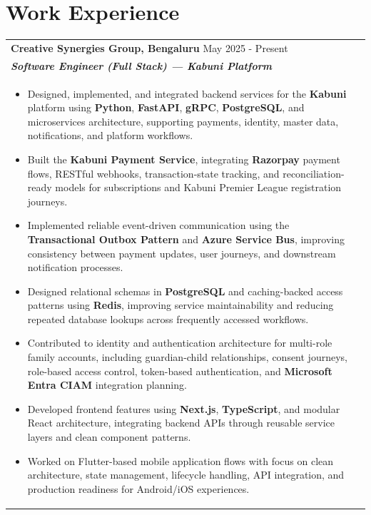 \documentclass[a4paper,8pt]{article}
\begin{document}
\section{Work Experience}
\begin{tabularx}{\linewidth}{ @{}l r@{} }
\textbf{{Creative Synergies Group, Bengaluru}} \hfill \color[HTML]{371e77} May 2025 - Present \\[4pt]
\color[HTML]{371e77}\textbf{\textit{Software Engineer (Full Stack) --- Kabuni Platform}}\ \hfill \color[HTML]{4B28A4} \\[5pt]
\begin{minipage}[t]{\linewidth}
    \begin{itemize}[nosep,after=\strut, leftmargin=2em, itemsep=2pt]
        \item Designed, implemented, and integrated backend services for the \textbf{Kabuni} platform using \textbf{Python}, \textbf{FastAPI}, \textbf{gRPC}, \textbf{PostgreSQL}, and microservices architecture, supporting payments, identity, master data, notifications, and platform workflows.
        \item Built the \textbf{Kabuni Payment Service}, integrating \textbf{Razorpay} payment flows, RESTful webhooks, transaction-state tracking, and reconciliation-ready models for subscriptions and Kabuni Premier League registration journeys.
        \item Implemented reliable event-driven communication using the \textbf{Transactional Outbox Pattern} and \textbf{Azure Service Bus}, improving consistency between payment updates, user journeys, and downstream notification processes.
        \item Designed relational schemas in \textbf{PostgreSQL} and caching-backed access patterns using \textbf{Redis}, improving service maintainability and reducing repeated database lookups across frequently accessed workflows.
        \item Contributed to identity and authentication architecture for multi-role family accounts, including guardian-child relationships, consent journeys, role-based access control, token-based authentication, and \textbf{Microsoft Entra CIAM} integration planning.
        \item Developed frontend features using \textbf{Next.js}, \textbf{TypeScript}, and modular React architecture, integrating backend APIs through reusable service layers and clean component patterns.
        \item Worked on Flutter-based mobile application flows with focus on clean architecture, state management, lifecycle handling, API integration, and production readiness for Android/iOS experiences.

\end{itemize}
\end{minipage}
\end{tabularx}
\end{document}
